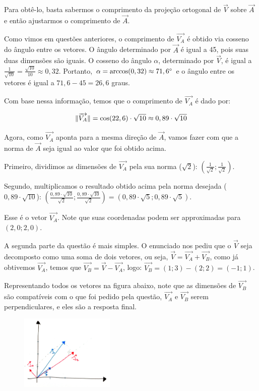 \documentclass[main.tex]{subfiles}
\begin{document}
Para obtê-lo, basta sabermos o comprimento da projeção ortogonal de $\overrightarrow{V}$ sobre $\overrightarrow{A}$ e então ajustarmos o comprimento de $\overrightarrow{A}$.

Como vimos em questões anteriores, o comprimento de $\overrightarrow{V_A}$ é obtido via cosseno do ângulo entre os vetores. O ângulo determinado por $\overrightarrow{A}$ é igual a 45\degree, pois suas duas dimensões são iguais. O cosseno do ângulo $\alpha$, determinado por $\overrightarrow{V}$, é igual a $\frac{1}{\sqrt{10}}=\frac{\sqrt{10}}{10} \approx 0,32$. Portanto, $\alpha = \arccos(0,32) \approx 71,6\degree$ e o ângulo entre os vetores é igual a $71,6-45=26,6$ graus.

Com base nessa informação, temos que o comprimento de $\overrightarrow{V_A}$ é dado por:

$$
\Arrowvert \overrightarrow{V_A} \Arrowvert = \cos(22,6) \cdot \sqrt{10} \approx 0,89 \cdot \sqrt{10}
$$

Agora, como $\overrightarrow{V_A}$ aponta para a mesma direção de $\overrightarrow{A}$, vamos fazer com que a norma de $\overrightarrow{A}$ seja igual ao valor que foi obtido acima.

Primeiro, dividimos as dimensões de $\overrightarrow{V_A}$ pela sua norma ($\sqrt{2}$): $(\frac{1}{\sqrt{2}};\frac{1}{\sqrt{2}})$.

Segundo, multiplicamos o resultado obtido acima pela norma desejada ($0,89 \cdot \sqrt{10}$): $(\frac{0,89 \cdot \sqrt{10}}{\sqrt{2}};\frac{0,89 \cdot \sqrt{10}}{\sqrt{2}}) = (0,89 \cdot \sqrt{5};0,89 \cdot \sqrt{5})$.

Esse é o vetor $\overrightarrow{V_A}$. Note que suas coordenadas podem ser approximadas para $(2,0;2,0)$.

A segunda parte da questão é mais simples. O enunciado nos pediu que o $\overrightarrow{V}$ seja decomposto como uma soma de dois vetores, ou seja, $\overrightarrow{V}=\overrightarrow{V_A}+\overrightarrow{V_B}$, como já obtivemos $\overrightarrow{V_A}$, temos que $\overrightarrow{V_B}=\overrightarrow{V}-\overrightarrow{V_A}$, logo: $\overrightarrow{V_B}=(1;3)-(2;2)=(-1;1)$.

Representando todos os vetores na figura abaixo, note que as dimensões de $\overrightarrow{V_B}$ são compatíveis com o que foi pedido pela questão, $\overrightarrow{V_A}$ e $\overrightarrow{V_B}$ serem perpendiculares, e eles são a resposta final.

\begin{figure}[h]
\centering
\includegraphics[width=0.4\textwidth]{./img/c4r3.jpg}
\end{figure}
\end{document}
